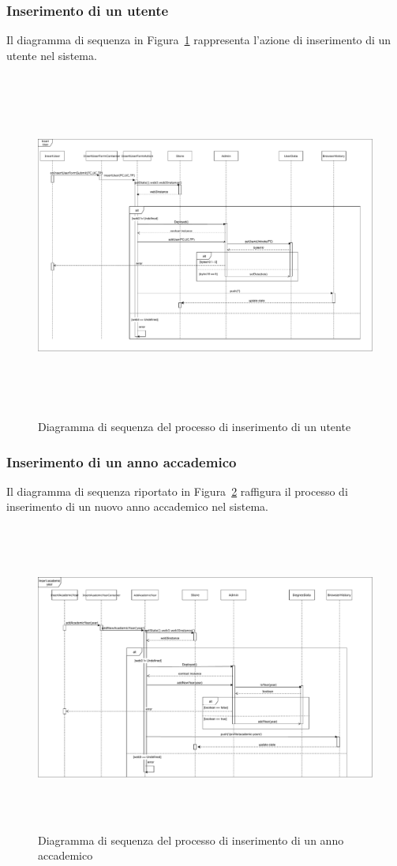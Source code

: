 		\subsubsection{Inserimento di un utente}
		Il diagramma di sequenza in Figura~\ref{fig:SeqInserimentoUtente} rappresenta l'azione di inserimento di un utente nel sistema.
		\begin{figure}[h]
			\centering
				\includegraphics[height=4.5in]{./Diagrammi/DiagrammaSequenzaInsertUser.pdf}
			\caption{Diagramma di sequenza del processo di inserimento di un utente}
			\label{fig:SeqInserimentoUtente}
		\end{figure}
		
		\subsubsection{Inserimento di un anno accademico}
		Il diagramma di sequenza riportato in Figura~\ref{fig:SeqInsertYear} raffigura il processo di inserimento di un nuovo anno accademico nel sistema.
		
		\begin{figure}[h]
			\centering
				\includegraphics[height=4in]{./Diagrammi/DiagrammaSequenzaInsertAcademicYear.pdf}
			\caption{Diagramma di sequenza del processo di inserimento di un anno accademico}
			\label{fig:SeqInsertYear}
		\end{figure}
		\clearpage
		
	
	
	
	
	